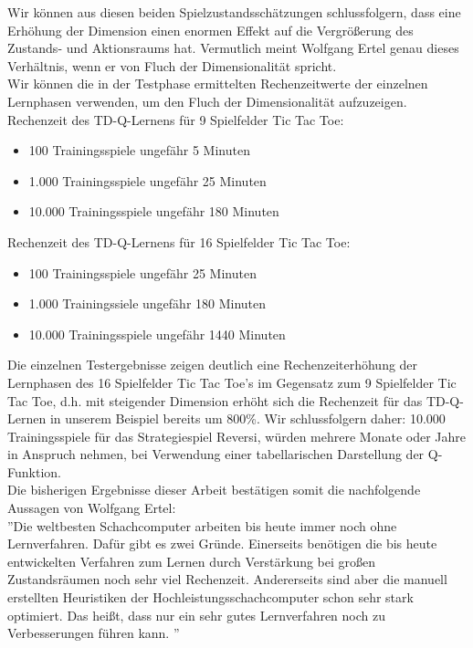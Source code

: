 Wir können aus diesen beiden Spielzustandsschätzungen schlussfolgern, dass eine Erhöhung der Dimension einen enormen Effekt auf die Vergrößerung des Zustands- und Aktionsraums hat. Vermutlich meint Wolfgang Ertel genau dieses Verhältnis, wenn er von Fluch der Dimensionalität spricht. \\

Wir können die in der Testphase ermittelten Rechenzeitwerte der einzelnen Lernphasen verwenden, um den Fluch der Dimensionalität aufzuzeigen. \\

Rechenzeit des TD-Q-Lernens für 9 Spielfelder Tic Tac Toe: 
\begin{itemize}
\item 100 Trainingsspiele ungefähr 5 Minuten 
\item 1.000 Trainingsspiele ungefähr 25 Minuten
\item 10.000 Trainingsspiele ungefähr 180 Minuten
\end{itemize}

Rechenzeit des TD-Q-Lernens für 16 Spielfelder Tic Tac Toe: 
\begin{itemize}
\item 100 Trainingsspiele ungefähr 25 Minuten
\item 1.000 Trainingssiele ungefähr 180 Minuten
\item 10.000 Trainingsspiele ungefähr 1440 Minuten
\end{itemize}

Die einzelnen Testergebnisse zeigen deutlich eine Rechenzeiterhöhung der Lernphasen des 16 Spielfelder Tic Tac Toe's im Gegensatz zum 9 Spielfelder Tic Tac Toe, d.h. mit steigender Dimension erhöht sich die Rechenzeit für das TD-Q-Lernen in unserem Beispiel bereits um 800\%. Wir schlussfolgern daher: 10.000 Trainingsspiele für das Strategiespiel Reversi, würden mehrere Monate oder Jahre in Anspruch nehmen, bei Verwendung einer tabellarischen Darstellung der Q-Funktion. \\

Die bisherigen Ergebnisse dieser Arbeit bestätigen somit die nachfolgende Aussagen von Wolfgang Ertel: \\

''Die weltbesten Schachcomputer arbeiten bis heute immer noch ohne Lernverfahren. Dafür gibt es zwei Gründe. Einerseits benötigen die bis heute entwickelten Verfahren zum Lernen durch Verstärkung bei großen Zustandsräumen noch sehr viel Rechenzeit. Andererseits sind aber die manuell erstellten Heuristiken der Hochleistungsschachcomputer schon sehr stark optimiert. Das heißt, dass nur ein sehr gutes Lernverfahren noch zu Verbesserungen führen kann. \cite[120]{Ertel}''\\

